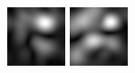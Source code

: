 \begin{figure}[ht]
\begin{center}
 \includegraphics[width=\columnwidth/9]{ch4/figures/mag_2_5.jpg}
 \includegraphics[width=\columnwidth/9]{ch4/figures/mag_2_6.jpg}

\end{center}
\end{figure}
